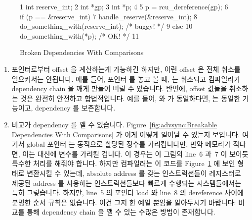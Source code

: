 \begin{enumerate}
\begin{figure}[tbp]
{ \scriptsize
\begin{verbbox}
 1 int reserve_int;
 2 int *gp;
 3 int *p;
 4
 5 p = rcu_dereference(gp);
 6 if (p == &reserve_int) {
 7   handle_reserve(&reserve_int);
 8   do_something_with(reserve_int); /* buggy! */
 9 } else {
10   do_something_with(*p); /* OK! */
11 }
\end{verbbox}
}
\centering
\theverbbox
\caption{Broken Dependencies With Comparisons}
\label{fig:advsync:Broken Dependencies With Comparisons}
\end{figure}

\begin{enumerate}
\item	포인터로부터 offset 을 계산하는게 가능하긴 하지만, 이런 offset 은 전체
	취소를 일으켜서는 안됩니다.
	예를 들어,  포인터  를 놓고 볼 때,
	 는 취소되고 컴파일러가 dependency chain 을 깨게
	만들어 버릴 수 있습니다.
	반면에, offset 값들을 취소하는 것은 완전히 안전하고 합법적입니다.
	예를 들어,  와  가 동일하다면,  는 동일한
	기능이고, dependency 를 보존합니다.

\item	비교가 dependency 를 깰 수 있습니다.
	Figure~\ref{fig:advsync:Breakable Dependencies With Comparisons}
	가 이게 어떻게 일어날 수 있는지 보입니다.
	여기서 global 포인터  는 동적으로 할당된 정수를 가리킵니다만,
	만약 메모리가 적다면, 이는 대신에  변수를 가리킬
	겁니다.
	이  경우는 이 그림의 line~6 과~7 이 보이듯 특수한
	처리를 해줘야 합니다.
	하지만 컴파일러는 이 코드를
	Figure~\ref{fig:advsync:Broken Dependencies With Comparisons} 에 보인
	형태로 변환시킬 수 있는데, absolute address 를 갖는 인스트럭션들이
	레지스터로 제공된 address 를 사용하는 인스트럭션들보다 빠르게 수행되는
	시스템들에서는 특히 그렇습니다.
	하지만, line~5 의 포인터 load 와 line~8 의 dereference 사이에 분명한
	순서 규칙은 없습니다.
	이건 그저 한 예일 뿐임을 알아두시기 바랍니다: 비교를 통해 dependency
	chain 을 깰 수 있는 수많은 방법이 존재합니다.
\iffalse


\end{enumerate}
\end{enumerate}
